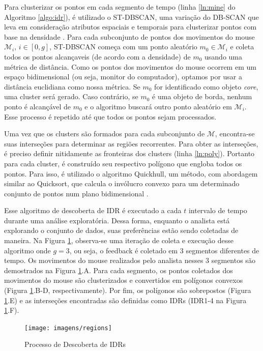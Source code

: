 Para clusterizar os pontos em cada segmento de tempo (linha \ref{ln:mine} do Algoritmo \ref{algo:idr}), é utilizado o ST-DBSCAN, uma variação do DB-SCAN que leva em consideração atributos espaciais e temporais para clusterizar pontos com base na densidade \cite{Birant:2007}. Para cada subconjunto de pontos dos movimentos do mouse $\mathcal{M}_i$, $i \in [0,g]$, ST-DBSCAN começa com um ponto aleatório $m_0 \in \mathcal{M}_i$ e coleta todos os pontos alcançaveis (de acordo com a densidade) de $m_0$ usando uma métrica de distância. Como os pontos dos movimentos do mouse ocorrem em um espaço bidimensional (ou seja, monitor do computador), optamos por usar a distância euclidiana como nossa métrica. Se $m_0$ for identificado como objeto {\em core}, uma cluster será gerado. Caso contrário, se $m_0$ é uma objeto de borda, nenhum ponto é alcançável de $m_0$ e o algoritmo buscará outro ponto aleatório em $\mathcal{M}_i$. Esse processo é repetido até que todos os pontos sejam processados.

Uma vez que os clusters são formados para cada subconjunto de $\mathcal{M}$, encontra-se suas interseções para determinar as regiões recorrentes. Para obter as interseções, é preciso definir nitidamente as fronteiras dos clusters (linha \ref{ln:poly}). Portanto para cada cluster, é construído seu respectivo polígono que engloba todos os pontos. Para isso, é utilizado o algoritmo Quickhull, um método, com abordagem similar ao Quicksort, que calcula o invólucro convexo para um determinado conjunto de pontos num plano bidimensional \cite{Barber:1996}.

Esse algoritmo de descoberta de IDR é executado a cada $t$ intervalo de tempo durante uma análise exploratória. Dessa forma, enquanto o analista está explorando o conjunto de dados, suas preferências estão sendo coletadas de maneira. Na Figura \ref{fig:descoberta-idr}, observa-se uma iteração de coleta e execução desse algoritmo onde $g = 3$, ou seja, o feedback é coletado em 3 segmentos diferentes de tempo. Os movimentos do mouse realizados pelo analista nesses 3 segmentos são demostrados na Figura \ref{fig:descoberta-idr}.A. Para cada segmento, os pontos coletados dos movimentos do mouse são clusterizados e convertidos em polígonos convexos (Figura \ref{fig:descoberta-idr}.B-D, respectivamente). Por fim, os polígonos são sobrepostos (Figura \ref{fig:descoberta-idr}.E) e as interseções encontradas são definidas como IDRs (IDR1-4 na Figura \ref{fig:descoberta-idr}.F).

\begin{figure}[t]
	\centering
	\texttt{[image: imagens/regions]}
	\caption{Processo de Descoberta de IDRs}
	\label{fig:descoberta-idr}
\end{figure}

